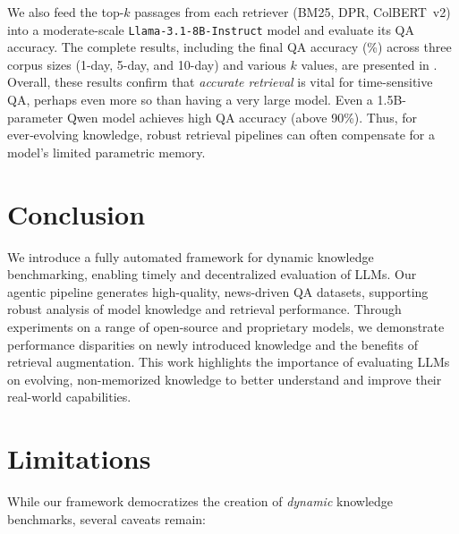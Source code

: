 \documentclass[11pt]{article}
\begin{document}
We also feed the top-$k$ passages 
from each retriever (BM25, DPR, ColBERT~v2) into a moderate-scale 
\texttt{Llama-3.1-8B-Instruct} model and evaluate its QA accuracy. The complete results, including the final QA accuracy (\%) across three corpus sizes (1-day, 5-day, and 10-day) and various $k$ values, are presented in . 
Overall, these results confirm that \emph{accurate retrieval} is vital for time-sensitive QA, perhaps even more so than having a very large model. Even a 1.5B-parameter Qwen model achieves high QA accuracy (above 90\%).
Thus, for ever‑evolving knowledge, robust retrieval pipelines can often compensate for a model’s limited parametric memory.



\section{Conclusion}

We introduce a fully automated framework for dynamic knowledge benchmarking, enabling timely and decentralized evaluation of LLMs. Our agentic pipeline generates high-quality, news-driven QA datasets, supporting robust analysis of model knowledge and retrieval performance. Through experiments on a range of open-source and proprietary models, we demonstrate performance disparities on newly introduced knowledge and the benefits of retrieval augmentation. This work highlights the importance of evaluating LLMs on evolving, non-memorized knowledge to better understand and improve their real-world capabilities.


\section*{Limitations}

\noindent
While our framework democratizes the creation of \emph{dynamic} knowledge benchmarks, several caveats remain:
\end{document}
